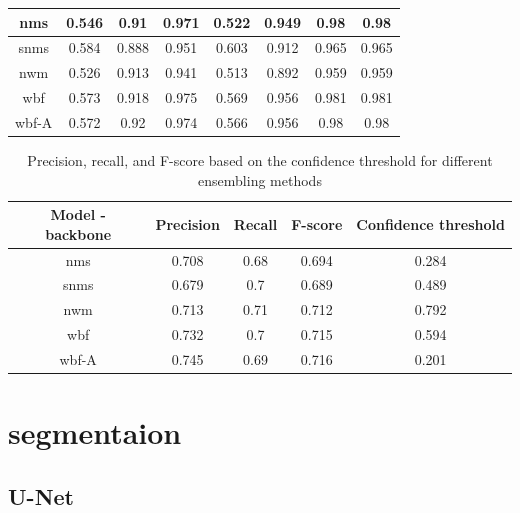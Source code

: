 \begin{table}[h]
    \centering
    \begin{tabular}{|c|c|c|c|c|c|c|c|}
        \hline
        nms   & 0.546 & 0.91  & 0.971 & 0.522 & 0.949 & 0.98  & 0.98  \\ \hline
        snms  & 0.584 & 0.888 & 0.951 & 0.603 & 0.912 & 0.965 & 0.965 \\ \hline
        nwm   & 0.526 & 0.913 & 0.941 & 0.513 & 0.892 & 0.959 & 0.959 \\ \hline
        wbf   & 0.573 & 0.918 & 0.975 & 0.569 & 0.956 & 0.981 & 0.981 \\ \hline
        wbf-A & 0.572 & 0.92  & 0.974 & 0.566 & 0.956 & 0.98  & 0.98  \\ \hline
    \end{tabular}
\end{table}


\begin{table}[h]
    \begin{tabular}{|c|c|c|c|c|}
        \hline
        Model - backbone & Precision & Recall & F-score & Confidence threshold \\ \hline
        nms              & 0.708     & 0.68   & 0.694   & 0.284                \\ \hline
        snms             & 0.679     & 0.7    & 0.689   & 0.489                \\ \hline
        nwm              & 0.713     & 0.71   & 0.712   & 0.792                \\ \hline
        wbf              & 0.732     & 0.7    & 0.715   & 0.594                \\ \hline
        wbf-A            & 0.745     & 0.69   & 0.716   & 0.201                \\ \hline
    \end{tabular}
    \caption{Precision, recall, and F-score based on the confidence threshold for different ensembling methods}
    \label{tab:ensembling_prf}
\end{table}

\section{segmentaion}
\subsection{U-Net}

